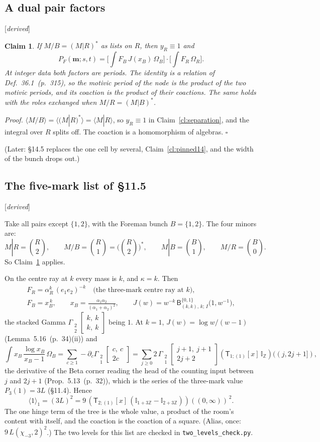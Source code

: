 \documentclass[11pt]{article}
\newcommand{\mvec}{\mathbf m}
\newcommand{\sB}{\mathsf B}
\newcommand{\sT}{\mathsf T}
\newcommand{\Gst}[4]{\Gamma_{\substack{#1\\#2}}\!\begin{bmatrix}#3\\#4\end{bmatrix}}
\newcommand{\IZ}{\mathbb I_{\mathbb Z}}
\newcommand{\Ilat}[1]{\mathbb I_{#1}}
\newcommand{\Tx}[3]{(\sT_{#1;(1)}[x]\,#2)((#3,\infty))}
\newcommand{\Th}[4]{(\sT_{#1;(1)}[x]\,#2)((#3,#4])}
\newcommand{\status}[1]{\hfill{\small[\textit{#1}]}}
\newcommand{\hb}[2]{#1~(p.~#2)}   %
\theoremstyle{plain}
\newtheorem{claim}{Claim}[section]
\theoremstyle{remark}
\begin{document}
\subsection{A dual pair factors}\status{derived}

\begin{claim}\label{cl:dualpair}
If $M/B=(M|R)^\ast$ as lists on $R$, then $y_R\equiv1$ and
\[
P_F(\mvec;s,t)=\Big[\int F_B\,J(x_B)\,\Omega_B\Big]\cdot\Big[\int F_R\,\Omega_R\Big].
\]
At integer data both factors are periods. The identity is a relation of Def.~\hb{36.1}{315}, so the motivic period of the node is the product of the two motivic periods, and its coaction is the product of their coactions. The same holds with the roles exchanged when $M/R=(M|B)^\ast$.
\end{claim}

\emph{Proof.} $\langle M/B\rangle=\langle(M|R)^\ast\rangle=\langle M|R\rangle$, so $y_R\equiv1$ in Claim~\ref{cl:separation}, and the integral over $R$ splits off. The coaction is a homomorphism of algebras. $\square$

(Later: \S14.5 replaces the one cell by several, Claim~\ref{cl:pinned14}, and the width of the bunch drops out.)

\subsection{The five-mark list of \S11.5}\status{derived}

Take all pairs except $\{1,2\}$, with the Foreman bunch $B=\{1,2\}$. The four minors are:
\[
M|R=\binom R2,\qquad M/B=\binom R1=\Big(\binom R2\Big)^{\!\ast},\qquad M|B=\binom B1,\qquad M/R=\binom B0 .
\]
So Claim~\ref{cl:dualpair} applies.

On the centre ray at $k$ every mass is $k$, and $\kappa=k$. Then
\begin{gather*}
F_R=\alpha_R^{k}\,(e_1e_2)^{-k}\quad\text{(the three-mark centre ray at $k$)},\\
F_B=x_B^{\,k},\qquad x_B=\frac{\alpha_1\alpha_2}{(\alpha_1+\alpha_2)^2},\qquad J(w)=w^{-k}\,\sB^{\{0,1\}}_{(k,k),\,k;\,I}\big(1,w^{-1}\big),
\end{gather*}
the stacked Gamma $\Gst22{k,\ k}{k,\ k}$ being $1$. At $k=1$, $J(w)=\log w/(w-1)$ (Lemma~\hb{5.16}{34}(ii)) and
\[
\int x_B\,\frac{\log x_B}{x_B-1}\,\Omega_B=\sum_{c\ge1}-\partial_c\Gst21{c,\ c}{2c}=\sum_{j\ge0}2\,\Gst21{j+1,\ j+1}{2j+2}\Th{1}{\IZ}{j}{2j+1},
\]
the derivative of the Beta corner reading the head of the counting input between $j$ and $2j+1$ (Prop.~\hb{5.13}{32}),
which is the series of the three-mark value $P_3(1)=3L$ (\S11.4). Hence
\[
\langle1\rangle_1=(3L)^2=9\,\Tx{2}{(\Ilat{1+3\mathbb Z}-\Ilat{2+3\mathbb Z})}{0}^{\,2}.
\]
The one hinge term of the tree is the whole value, a product of the room's content with itself, and the coaction is the coaction of a square. (Alias, once: $9\,L(\chi_{-3},2)^2$.) The two levels for this list are checked in \texttt{two\_levels\_check.py}.
\end{document}
